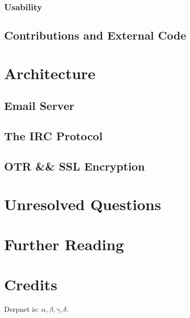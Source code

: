 \documentclass[11pt]{article}
\begin{document}
\subsubsection{Usability}



\subsection{Contributions and External Code}

\section{Architecture}

\subsection{Email Server}

\subsection{The IRC Protocol}

\subsection{OTR \&\& SSL Encryption}

\section{Unresolved Questions}

\section{Further Reading}

\section{Credits}

Derpnet is: $\alpha, \beta, \gamma, \delta$.
\end{document}
